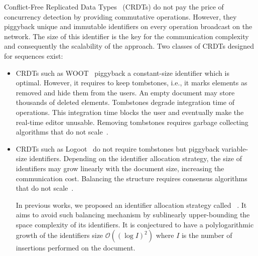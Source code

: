 Conflict-Free Replicated Data Types~\cite{shapiro2011comprehensive} (CRDTs) do
not pay the price of concurrency detection by providing commutative
operations. However, they piggyback unique and immutable identifiers on every
operation broadcast on the network. The size of this identifier is the key for
the communication complexity and consequently the scalability of the
approach. Two classes of CRDTs designed for sequences exist:
\begin{itemize}[noitemsep, leftmargin=*]
\item  CRDTs such as WOOT~\cite{oster2006data} piggyback a constant-size
  identifier which is optimal. However, it requires to keep tombstones, i.e., it
  marks elements as removed and hide them from the users. An empty document may
  store thousands of deleted elements. Tombstones degrade integration time of
  operations. This integration time blocks the user and eventually make the
  real-time editor unusable. Removing tombstones requires garbage collecting
  algorithms that do not scale~\cite{abdullahi1998garbage}.
\item CRDTs such as Logoot~\cite{weiss2010logootundo} do not require tombstones
  but piggyback variable-size identifiers. Depending on the identifier
  allocation strategy, the size of identifiers may grow linearly with the
  document size, increasing the communication cost. Balancing the structure
  requires consensus algorithms that do not
  scale~\cite{mostefaoui2015signature}.

  In previous works, we proposed an identifier allocation strategy called
  \LSEQ~\cite{nedelec2013concurrency, nedelec2013lseq}. It aims to avoid such
  balancing mechanism by sublinearly upper-bounding the space complexity of its
  identifiers. It is conjectured to have a polylogarithmic growth of the
  identifiers size $\mathcal{O}((\log I)^2)$ where $I$ is the number of
  insertions performed on the document.
\end{itemize}

